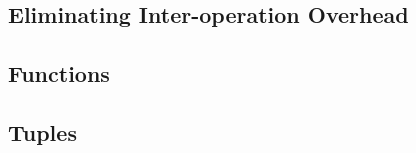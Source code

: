 \subsection{Eliminating Inter-operation Overhead}




\subsection{Functions}






\subsection{Tuples}




